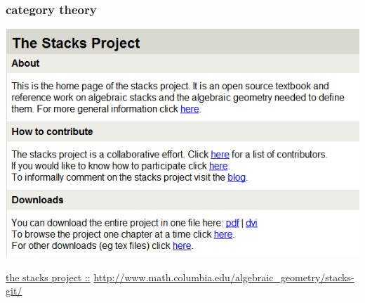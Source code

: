 \begin{frame}
\frametitle{category theory}
	\begin{center}
		\includegraphics[scale=0.4]{fig/stacksproject.png}
	\end{center}
	\href{http://www.math.columbia.edu/algebraic_geometry/stacks-git/}{the stacks project ::}
	\url{http://www.math.columbia.edu/algebraic_geometry/stacks-git/}
\end{frame}